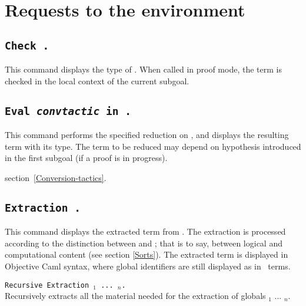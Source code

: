 \section{Requests to the environment}

\subsection{\tt Check {\term}.}
\label{Check}
This command displays the type of {\term}. When called in proof mode, 
the term is checked in the local context of the current subgoal.


\subsection{\tt Eval {\rm\sl convtactic} in {\term}.}

This command performs the specified reduction on {\term}, and displays
the resulting term with its type. The term to be reduced may depend on
hypothesis introduced in the first subgoal (if a proof is in
progress).


\SeeAlso section~\ref{Conversion-tactics}.

\subsection{\tt Extraction \term.}
\label{ExtractionTerm}
This command displays the extracted term from
{\term}. The extraction is processed according to the distinction
between {\Set} and {\Prop}; that is to say, between logical and
computational content (see section \ref{Sorts}). The extracted term is
displayed in Objective Caml syntax, where global identifiers are still
displayed as in \Coq\ terms.

\begin{Variants}
\item \texttt{Recursive Extraction {\qualid$_1$} ... {\qualid$_n$}.}\\
  Recursively extracts all the material needed for the extraction of 
  globals {\qualid$_1$} ... {\qualid$_n$}.
\end{Variants}

